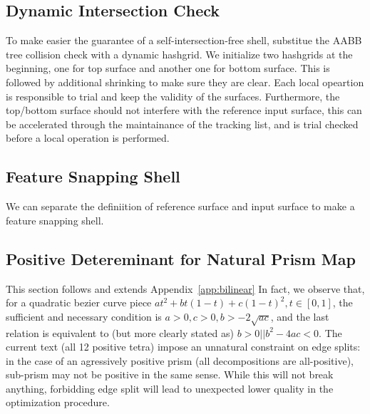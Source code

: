 \subsection{Dynamic Intersection Check}
To make easier the guarantee of a self-intersection-free shell, substitue the AABB tree collision check with a dynamic hashgrid. We initialize two hashgrids at the beginning, one for top surface and another one for bottom surface. This is followed by additional shrinking to make sure they are clear. Each local opeartion is responsible to trial and keep the validity of the surfaces. Furthermore, the top/bottom surface should not interfere with the reference input surface, this can be accelerated through the maintainance of the tracking list, and is trial checked before a local operation is performed.

\subsection{Feature Snapping Shell}
We can separate the definiition of reference surface and input surface to make a feature snapping shell.

\subsection{Positive Detereminant for Natural Prism Map}
This section follows and extends Appendix~\ref{app:bilinear}
In fact, we observe that, for a quadratic bezier curve piece $a t^2 + b t (1-t) + c (1-t)^2, t\in [0,1]$, the sufficient and necessary condition is $a>0, c>0, b > - 2 \sqrt{a c}$, and the last relation is equivalent to (but more clearly stated as) $b > 0 || b^2 - 4 a c < 0$.
The current text (all 12 positive tetra) impose an unnatural constraint on edge splits: in the case of an agressively positive prism (all decompositions are all-positive), sub-prism may not be positive in the same sense. While this will not break anything, forbidding edge split will lead to unexpected lower quality in the optimization procedure.
